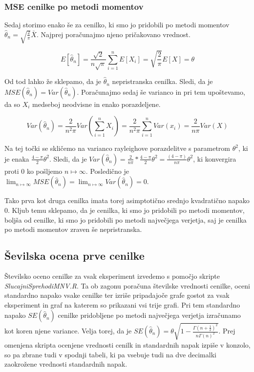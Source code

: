 \documentclass[a4paper, 10pt]{article}
\begin{document}
	\subsubsection{MSE cenilke po metodi momentov}\label{subsubsect: 2C2}
	Sedaj storimo enako še za cenilko, ki smo jo pridobili po metodi momentov $\widehat{\theta}_n = \sqrt{\frac{2}{\pi}}\bar{X}$. Najprej poračunajmo njeno pričakovano vrednost.
	
	\begin{equation*}		
		E[\widehat{\theta}_n] = \frac{\sqrt{2}}{n\sqrt{\pi}} \sum_{i=1}^{n} E[X_i] = \sqrt{\frac{2}{\pi}} E[X] = \theta
	\end{equation*}
	
	Od tod lahko že sklepamo, da je $\widehat{\theta}_n$ nepristranska cenilka. Sledi, da je $MSE(\widehat{\theta}_n) = Var(\widehat{\theta}_n)$. Poračunajmo sedaj še varianco in pri tem upoštevamo, da so $X_i$ medseboj neodvisne in enako porazdeljene.
	
	\begin{equation*}		
		Var(\widehat{\theta}_n) = \frac{2}{n^2\pi}Var(\sum_{i = 1}^{n}X_i) = \frac{2}{n^2 \pi} \sum_{i = 1}^{n}Var(x_i) = \frac{2}{n \pi} Var(X)
	\end{equation*}
	
	Na tej točki se skličemo na varianco rayleighove porazdelitve s parametrom $\theta^2$, ki je enaka $\frac{4 - \pi}{2}\theta^2$. Sledi, da je $Var(\widehat{\theta}_n) = \frac{2}{n\pi} * \frac{4 - \pi}{2}\theta^2 = \frac{(4-\pi)}{n\pi}\theta^2$, ki konvergira proti $0$ ko pošljemo $n\mapsto\infty$. Posledično je $\lim_{n\mapsto\infty}MSE(\widehat{\theta}_n) = \lim_{n\mapsto\infty} Var(\widehat{\theta}_n) =0$.
	
	Tako prva kot druga cenilka imata torej asimptotično srednjo kvadratično napako $0$. Kljub temu sklepamo, da je cenilka, ki smo jo pridobili po metodi momentov, boljša od cenilke, ki smo jo pridobili po metodi največjega verjetja, saj je cenilka po metodi momentov zraven še nepristranska.
	
	\subsection{Ševilska ocena prve cenilke} \label{subsect: 2D}
	
	Številsko oceno cenilke za vsak eksperiment izvedemo s pomočjo skripte \textit{SlucajniSprehodiMNV.R}. Ta ob zagonu poračuna številske vrednosti cenilke, oceni standardno napako vsake cenilke ter izriše pripadajoče grafe gostot za vsak eksperiment in graf na katerem so prikazani vsi trije grafi. Pri tem standardno napako $SE(\widehat{\theta}_n)$ cenilke pridobljene po metodi največjega verjetja izračunamo kot koren njene variance. Velja torej, da je $SE(\widehat{\theta}_n) = \theta\sqrt{1 - \frac{\Gamma(n + \frac{1}{2})^2}{n\Gamma(n)^2}}$.
	Prej omenjena skripta ocenjene vrednosti cenilk in standardnih napak izpiše v konzolo, so pa zbrane tudi v spodnji tabeli, ki pa vsebuje tudi na dve decimalki zaokrožene vrednosti standardnih napak.
	
\end{document}
